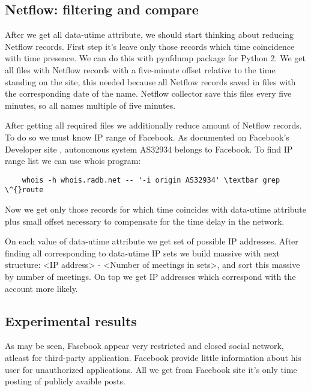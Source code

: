  \subsection{Netflow: filtering and compare}
 After we get all data-utime attribute, we should start thinking about reducing Netflow records. First step it's leave only those records which time coincidence with time presence. We can do this with pynfdump package for Python 2. We get all files with Netflow records with a five-minute offset relative to the time standing on the site, this needed because all Netflow records saved in files with the corresponding date of the name. Netflow collector save this files every five minutes, so all names multiple of five minutes. \par After getting all required files we additionally reduce amount of Netflow records. To do so we must know IP range of Facebook. As documented on Facebook's Developer site \cite{fbDevelop}, autonomous system AS32934 belongs to Facebook. To find IP range list we can use whois program:
 \begin{lstlisting}
    whois -h whois.radb.net -- '-i origin AS32934' \textbar grep \^{}route
\end{lstlisting}
Now we get only those records for which time coincides with data-utime attribute plus small offset necessary to compensate for the time delay in the network. \par On each value of data-utime attribute we get set of possible IP addresses. After finding all corresponding to data-utime IP sets we build massive with next structure: <IP address> - <Number of meetings in sets>, and sort this massive by number of meetings. On top we get IP addresses which correspond with the account more likely.
\subsection{Experimental results}
As may be seen, Fasebook appear very restricted and closed social network, atleast for third-party application. Facebook provide little information about his user for unauthorized applications. All we get from Facebook site it's only time posting of publicly avaible posts.
